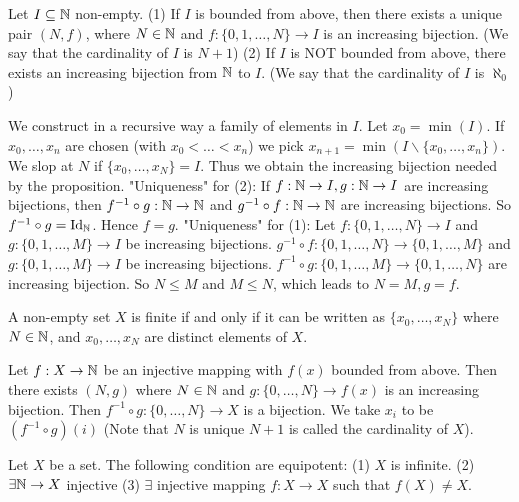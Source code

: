 \documentclass{book}
\numberwithin{equation}{section}
\begin{document}
\begin{propositionenv}
    Let $I\subseteq \mathbb{N}$ non-empty.
    \newline
    (1) If $I$ is bounded from above, then there exists a unique pair $(N,f)$, where $N\in \mathbb{N}$ and $f:\{0,1,\dots,N\}\rightarrow I$ is an increasing bijection. (We say that the cardinality of $I$ is $N+1$)
    \newline
    (2) If $I$ is NOT bounded from above, there exists an increasing bijection from $\mathbb{N}$ to $I$. (We say that the cardinality of $I$ is $\aleph_0$) 
\end{propositionenv}
\begin{proofenv}
    \quad
    \newline
    We construct in a recursive way a family of elements in $I$. Let $x_0=\min(I)$. If $x_0,\dots ,x_n$ are chosen (with $x_0<\dots<x_n$) we pick $x_{n+1}=\min(I\backslash\{x_0,\dots,x_n\})$. We slop at $N$ if $\{x_0,\dots,x_N\}=I$. Thus we obtain the increasing bijection needed by the proposition.
    \newline
    "Uniqueness" for (2): If $f:\mathbb{N}\rightarrow I,g:\mathbb{N}\rightarrow I$ are increasing bijections, then $f^{-1}\circ g:\mathbb{N}\rightarrow\mathbb{N}$ and $g^{-1}\circ f:\mathbb{N}\rightarrow\mathbb{N}$ are increasing bijections. So $f^{-1}\circ g=\mathrm{Id}_{\mathbb{N}}$. Hence $f=g$.
    \newline
    "Uniqueness" for (1): Let $f:\{0,1,\dots,N\}\rightarrow I$ and $g:\{0,1,\dots,M\}\rightarrow I$ be increasing bijections. $g^{-1}\circ f:\{0,1,\dots,N\}\rightarrow \{0,1,\dots, M\}$ and $g:\{0,1,\dots,M\}\rightarrow I$ be increasing bijections. $f^{-1}\circ g:\{0,1,\dots,M\}\rightarrow \{0,1,\dots, N\}$ are increasing bijection. So $N\le M$ and $M\le N$, which leads to $N=M,g=f$. 
\end{proofenv}
\begin{corollaryenv}
    A non-empty set $X$ is finite if and only if it can be written as $\{x_0,\dots,x_N\}$ where $N\in \mathbb{N}$, and $x_0,\dots,x_N$ are distinct elements of $X$.
\end{corollaryenv}
\begin{proofenv}
    Let $f:X\rightarrow \mathbb{N}$ be an injective mapping with $f(x)$ bounded from above. Then there exists $(N,g)$ where $N\in \mathbb{N}$ and $g:\{0,\dots ,N\}\rightarrow f(x)$ is an increasing bijection. Then $f^{-1}\circ g:\{0,\dots,N\}\rightarrow X$ is a bijection. We take $x_i$ to be $(f^{-1}\circ g)(i)$ (Note that $N$ is unique $N+1$ is called the cardinality of $X$).
\end{proofenv}
\begin{propositionenv}
    Let $X$ be a set. The following condition are equipotent:
    \newline
    (1) $X$ is infinite.
    \newline
    (2) $\exists \mathbb{N}\rightarrow X$ injective
    \newline
    (3) $\exists$ injective mapping $f:X\rightarrow X$ such that $f(X)\not=X$.
\end{propositionenv}
\end{document}
